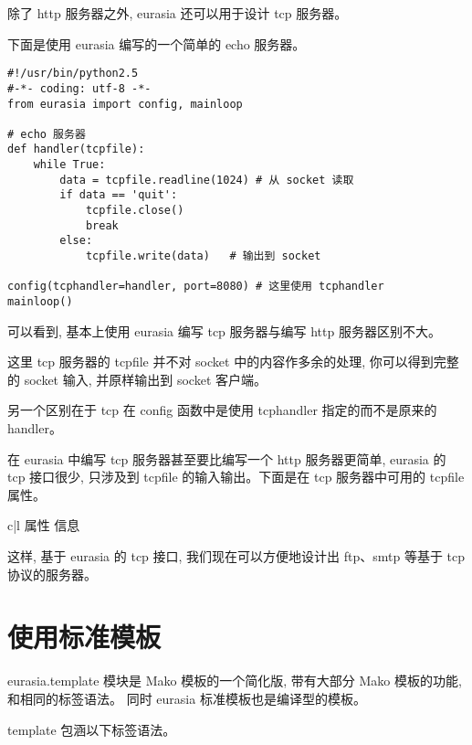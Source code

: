 \documentclass{manual}
\begin{document}
除了 http 服务器之外, eurasia 还可以用于设计 tcp 服务器。

下面是使用 eurasia 编写的一个简单的 echo 服务器。

\begin{verbatim}
#!/usr/bin/python2.5
#-*- coding: utf-8 -*-
from eurasia import config, mainloop

# echo 服务器
def handler(tcpfile):
	while True:
		data = tcpfile.readline(1024) # 从 socket 读取
		if data == 'quit':
			tcpfile.close()
			break
		else:
			tcpfile.write(data)   # 输出到 socket

config(tcphandler=handler, port=8080) # 这里使用 tcphandler
mainloop()
\end{verbatim}

可以看到, 基本上使用 eurasia 编写 tcp 服务器与编写 http 服务器区别不大。

这里 tcp 服务器的 tcpfile 并不对 socket 中的内容作多余的处理,
你可以得到完整的 socket 输入, 并原样输出到 socket 客户端。

另一个区别在于 tcp 在 config 函数中是使用 tcphandler 指定的而不是原来的 handler。

在 eurasia 中编写 tcp 服务器甚至要比编写一个 http 服务器更简单,
eurasia 的 tcp 接口很少, 只涉及到 tcpfile 的输入输出。下面是在 tcp 服务器中可用的 tcpfile 属性。

\begin{tableii}{c|l}{}{ 属性 }{ 信息 }
\end{tableii}

这样, 基于 eurasia 的 tcp 接口, 我们现在可以方便地设计出 ftp、smtp 等基于 tcp 协议的服务器。

\section{使用标准模板}

eurasia.template 模块是 Mako 模板的一个简化版, 带有大部分 Mako 模板的功能, 和相同的标签语法。
同时 eurasia 标准模板也是编译型的模板。

template 包涵以下标签语法。
\end{document}
